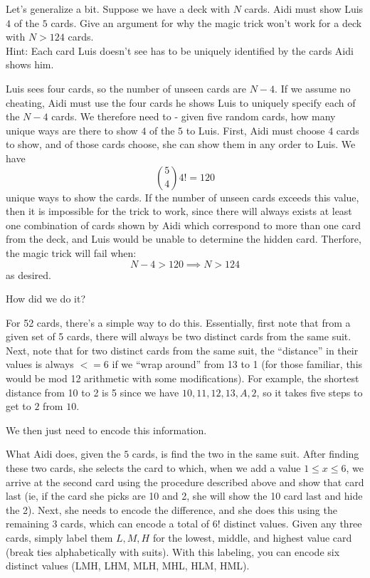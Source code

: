 \documentclass[11pt]{article}
\begin{document}
\begin{exercise}
Let's generalize a bit. Suppose we have a deck with $N$ cards. Aidi must show Luis $4$ of the $5$ cards. Give an argument for why the magic trick won't work for a deck with $N > 124$ cards. \\
Hint: Each card Luis doesn't see has to be uniquely identified by the cards Aidi shows him.
\end{exercise}
\begin{solution}
Luis sees four cards, so the number of unseen cards are $N - 4$. If we assume no cheating, Aidi must use the four cards he shows Luis to uniquely specify each of the $N - 4$ cards. We therefore need to - given five random cards, how many unique ways are there to show $4$ of the $5$ to Luis. First, Aidi must choose $4$ cards to show, and of those cards choose, she can show them in any order to Luis. We have
$$
{5 \choose 4}4! = 120
$$
unique ways to show the cards. If the number of unseen cards exceeds this value, then it is impossible for the trick to work, since there will always exists at least one combination of cards shown by Aidi which correspond to more than one card from the deck, and Luis would be unable to determine the hidden card. Therfore, the magic trick will fail when:
$$
N - 4 > 120 \implies N > 124
$$
as desired.
\end{solution}

\begin{exercise}[Bonus]
How did we do it?
\end{exercise}
\begin{solution}
For 52 cards, there's a simple way to do this. Essentially, first note that from a given set of 5 cards, there will always be two distinct cards from the same suit. Next, note that for two distinct cards from the same suit, the ``distance'' in their values is always $<= 6$ if we ``wrap around'' from 13 to 1 (for those familiar, this would be mod 12 arithmetic with some modifications). For example, the shortest distance from 10 to 2 is 5 since we have $10,11,12,13,A,2$, so it takes five steps to get to $2$ from $10$.

We then just need to encode this information.

What Aidi does, given the $5$ cards, is find the two in the same suit. After finding these two cards, she selects the card to which, when we add a value $1 \leq x \leq 6$, we arrive at the second card using the procedure described above and show that card last (ie, if the card she picks are 10 and 2, she will show the 10 card last and hide the 2). Next, she needs to encode the difference, and she does this using the remaining 3 cards, which can encode a total of $6!$ distinct values. Given any three cards, simply label them $L,M,H$ for the lowest, middle, and highest value card (break ties alphabetically with suits). With this labeling, you can encode six distinct values (LMH, LHM, MLH, MHL, HLM, HML).
\end{solution}
\end{document}
